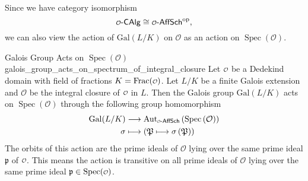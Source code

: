 Since we have category isomorphism
\[
\mathcalo \text{-}\mathsf{CAlg}\cong \mathcalo \text{-}\mathsf{AffSch}^{\mathrm{op}},
\]
we can also view the action of $\mathrm{Gal}(L/K)$ on $\mathcal{O}$ as an action on $\operatorname{Spec}\left(\mathcal{O}\right)$.

\begin{proposition}{Galois Group Acts on $\operatorname{Spec}\left(\mathcal{O}\right)$}{galois_group_acts_on_spectrum_of_integral_closure}
    Let $\mathcalo$ be a Dedekind domain with field of fractions $K=\mathrm{Frac}(\mathcalo)$. Let $L/K$ be a finite Galois extension and $\mathcal{O}$ be the integral closure of $\mathcalo$ in $L$. Then the Galois group $\mathrm{Gal}(L/K)$ acts on $\operatorname{Spec}\left(\mathcal{O}\right)$ through the following group homomorphism
    \begin{align*}
        \mathrm{Gal}(L/K)&\longrightarrow \mathrm{Aut}_{\mathcalo \text{-}\mathsf{AffSch}}\left(\operatorname{Spec}\left(\mathcal{O}\right)\right)\\
        \sigma&\longmapsto \left(\mathfrak{P}\longmapsto\sigma\left(\mathfrak{P}\right)\right)
    \end{align*}
    The orbits of this action are the prime ideals of $\mathcal{O}$ lying over the same prime ideal $\mathfrak{p}$ of $\mathcalo$. This means the action is transitive on all prime ideals of $\mathcal{O}$ lying over the same prime ideal $\mathfrak{p}\in \spec(\mathcalo)$.
\end{proposition}
